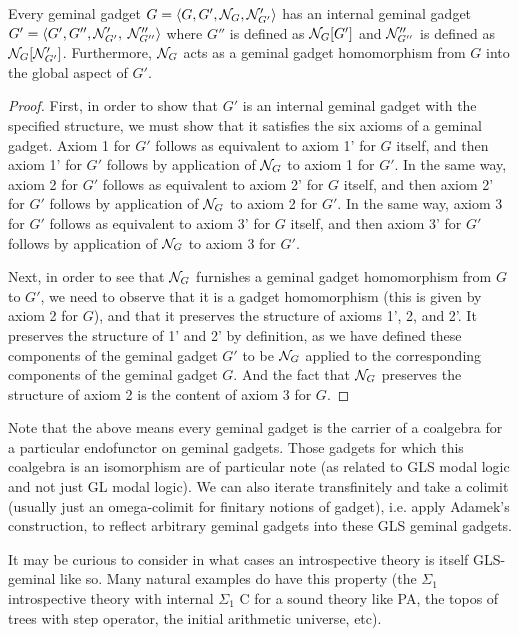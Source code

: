 \begin{theorem}\label{GLContainsGL}
Every geminal gadget $G = \langle G, G', \mathcal{N}_{G}, \mathcal{N}'_{G'}\rangle$ has an internal geminal gadget $G' = \langle G', G'', \mathcal{N}'_{G'},$ $\mathcal{N}''_{G''}\rangle$ where $G''$ is defined as $\mathcal{N}_{G}[G']$ and $\mathcal{N}''_{G''}$ is defined as $\mathcal{N}_{G}[\mathcal{N}'_{G'}]$. Furthermore, $\mathcal{N}_{G}$ acts as a geminal gadget homomorphism from $G$ into the global aspect of $G'$.
\end{theorem}
\begin{proof}
First, in order to show that $G'$ is an internal geminal gadget with the specified structure, we must show that it satisfies the six axioms of a geminal gadget. Axiom 1 for $G'$ follows as equivalent to axiom 1' for $G$ itself, and then axiom 1' for $G'$ follows by application of $\mathcal{N}_{G}$ to axiom 1 for $G'$. In the same way, axiom 2 for $G'$ follows as equivalent to axiom 2' for $G$ itself, and then axiom 2' for $G'$ follows by application of $\mathcal{N}_{G}$ to axiom 2 for $G'$. In the same way, axiom 3 for $G'$ follows as equivalent to axiom 3' for $G$ itself, and then axiom 3' for $G'$ follows by application of $\mathcal{N}_{G}$ to axiom 3 for $G'$.

Next, in order to see that $\mathcal{N}_{G}$ furnishes a geminal gadget homomorphism from $G$ to $G'$, we need to observe that it is a gadget homomorphism (this is given by axiom 2 for $G$), and that it preserves the structure of axioms 1', 2, and 2'. It preserves the structure of 1' and 2' by definition, as we have defined these components of the geminal gadget $G'$ to be $\mathcal{N}_{G}$ applied to the corresponding components of the geminal gadget $G$. And the fact that $\mathcal{N}_{G}$ preserves the structure of axiom 2 is the content of axiom 3 for $G$.
\end{proof}

\begin{TODOblock}
Note that the above means every geminal gadget is the carrier of a coalgebra for a particular endofunctor on geminal gadgets. Those gadgets for which this coalgebra is an isomorphism are of particular note (as related to GLS modal logic and not just GL modal logic). We can also iterate transfinitely and take a colimit (usually just an omega-colimit for finitary notions of gadget), i.e. apply Adamek's construction, to reflect arbitrary geminal gadgets into these GLS geminal gadgets.

It may be curious to consider in what cases an introspective theory is itself GLS-geminal like so. Many natural examples do have this property (the $\Sigma_1$ introspective theory with internal $\Sigma_1$ C for a sound theory like PA, the topos of trees with step operator, the initial arithmetic universe, etc).
\end{TODOblock}


